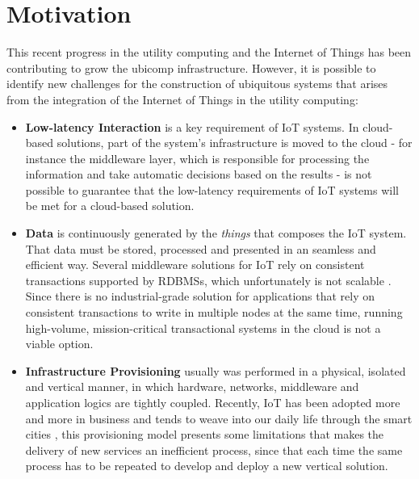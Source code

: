 \section{Motivation}
\label{section:motivation}
This recent progress in the utility computing and the Internet of Things has been contributing to grow the
\gls{ubicomp} infrastructure. However, it is possible to identify new challenges \cite{caceres2012ubicomp}
for the construction of ubiquitous systems that arises from the integration of the Internet of Things
in the utility computing:

\begin{itemize}
  \item \textbf{Low-latency Interaction} is a key requirement of \gls{IoT} systems. In cloud-based
  solutions, part of the system's infrastructure is moved to the cloud - for instance the middleware layer,
  which is responsible for processing the information and take automatic decisions based on the results
  - is not possible to guarantee that the low-latency requirements of \gls{IoT} systems will be
  met for a cloud-based solution.
  \item \textbf{Data} is continuously generated by the \textit{things} that composes the \gls{IoT}
  system. That data must be stored, processed and presented in an seamless and efficient way. Several
  middleware solutions for \gls{IoT} \cite{floerkemeier2007rfid}\cite{eisenhauer2010hydra}\cite{de2008socrades}
  rely on consistent transactions supported by \glspl{RDBMS}, which unfortunately is not scalable
  \cite{hofmann2010cloud}. Since there is no industrial-grade solution for applications that rely on
  consistent transactions to write in multiple nodes at the same time, running high-volume, mission-critical
  transactional systems in the cloud is not a viable option.
  \item \textbf{Infrastructure Provisioning} usually was performed in a physical, isolated and vertical
  manner, in which hardware, networks, middleware and application logics are tightly coupled. Recently,
  \gls{IoT} has been adopted more and more in business and tends to weave into our daily life through the smart cities
  \cite{caragliu2011smart}\cite{schaffers2011smart}, this provisioning model presents some limitations
  that makes the delivery of new services an inefficient process, since that each time the same process
  has to be repeated to develop and deploy a new vertical solution.

\end{itemize}
